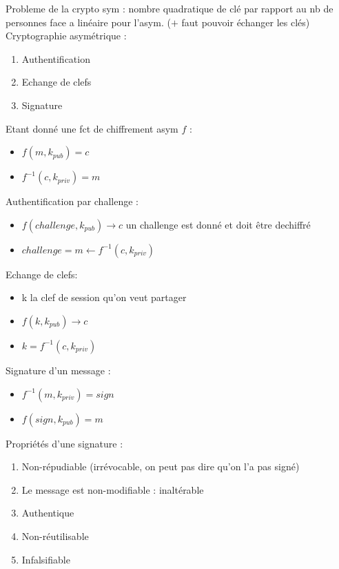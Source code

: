 \documentclass[12pt]{article}
\theoremstyle{plain}
\theoremstyle{definition}
\begin{document}
Probleme de la crypto sym : nombre quadratique de clé par rapport au nb de personnes face a linéaire pour l'asym. ($+$ faut pouvoir échanger les clés)\\

\noindent Cryptographie asymétrique : \begin{enumerate}
    \item Authentification
    \item Echange de clefs
    \item Signature
\end{enumerate}


Etant donné une fct de chiffrement asym $f$ :
\begin{itemize}
    \item $f(m,k_{pub})=c$
    \item $f^{-1}(c, k_{priv})=m$
\end{itemize}
Authentification par challenge :
\begin{itemize}
    \item $f(challenge,k_{pub})\rightarrow c$ un challenge est donné et doit être dechiffré
    \item $challenge=m\leftarrow f^{-1}(c,k_{priv})$ 
\end{itemize}

\noindent Echange de clefs:
\begin{itemize}
    \item k la clef de session qu'on veut partager
    \item $f(k,k_{pub})\rightarrow c$ 
    \item $k=f^{-1}(c, k_{priv})$
\end{itemize}
\noindent Signature d'un message :
\begin{itemize}
    \item $f^{-1}(m, k_{priv})=sign$
    \item $f(sign, k_{pub})=m$
\end{itemize}

Propriétés d'une signature :
\begin{enumerate}
    \item Non-répudiable (irrévocable, on peut pas dire qu'on l'a pas signé)
    \item Le message est non-modifiable : inaltérable
    \item Authentique
    \item Non-réutilisable
    \item Infalsifiable
\end{enumerate}
\end{document}
